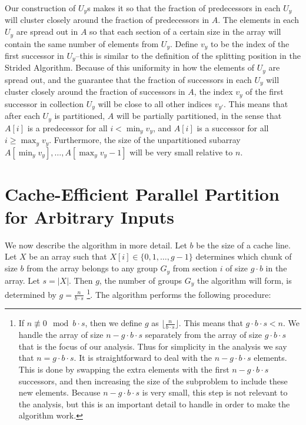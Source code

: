 \documentclass[twocolumn, twoside, 11pt]{article}
\renewcommand{\paragraph}[1]{\vspace{0.09in}\noindent{\bf \boldmath #1.}}
\begin{document}
Our construction of $U_y$s makes it so that the fraction of predecessors in each $U_y$ will cluster closely around the fraction of predecessors in $A$.
The elements in each $U_y$ are spread out in $A$ so that each section of a certain size in the array will contain the same number of elements from $U_y$. 
Define $v_y$ to be the index of the first successor in $U_y$--this is similar to the definition of the splitting position in the Strided Algorithm.
Because of this uniformity in how the elements of $U_y$ are spread out, and the guarantee that the fraction of successors in each $U_y$ will cluster closely around the fraction of successors in $A$, the index $v_y$ of the first successor in collection $U_y$ will be close to all other indices $v_{y'}$.
This means that after each $U_y$ is partitioned, $A$ will be partially partitioned, in the sense that $A[i]$ is a predecessor for all $i < \min_y{v_y}$, and $A[i]$ is a successor for all $i \ge \max_y{v_y}$.
Furthermore, the size of the unpartitioned subarray $A[\min_y{v_y}],\ldots,A[\max_y{v_y}-1]$ will be very small relative to $n$. 


\section{Cache-Efficient Parallel Partition for Arbitrary Inputs}
\paragraph{Algorithm Description}
We now describe the algorithm in more detail.
Let $b$ be the size of a cache line.
Let $X$ be an array such that $X[i] \in \{0,1,\ldots,g-1\}$ determines which chunk of size $b$ from the array belongs to any group $G_y$ from section $i$ of size $g\cdot b$ in the array.
Let $s = |X|$.
Then $g$, the number of groups $G_y$ the algorithm will form, is determined by $g=\frac{n}{b\cdot s}$
\footnote{If $n \not\equiv 0 \mod b\cdot s$, then we define $g$ as $\Big\lfloor \frac{n}{b\cdot s}\Big\rfloor $. 
This means that $g\cdot b \cdot s < n$. 
We handle the array of size $n-g\cdot b \cdot s$ separately from the array of size $g\cdot b \cdot s$ that is the focus of our analysis.
Thus for simplicity in the analysis we say that $n=g\cdot b\cdot s$.
It is straightforward to deal with the $n-g\cdot b\cdot s$ elements.
This is done by swapping the extra elements with the first $n-g\cdot b\cdot s$ successors, and then increasing the size of the subproblem to include these new elements.
Because $n-g\cdot b\cdot s$ is very small, this step is not relevant to the analysis, but this is an important detail to handle in order to make the algorithm work. }.
The algorithm performs the following procedure:
\end{document}
